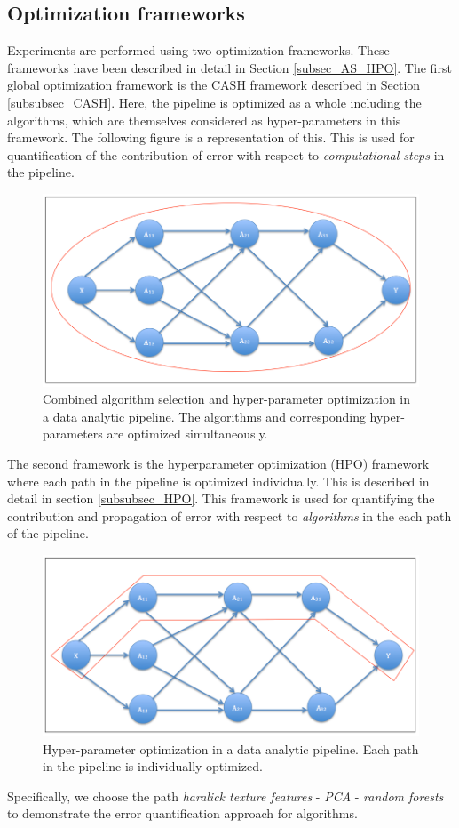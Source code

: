 \subsection{Optimization frameworks}
\label{frameworks}
Experiments are performed using two optimization frameworks. These frameworks have been described in detail in Section \ref{subsec_AS_HPO}. 
The first global optimization framework is the CASH framework described in Section \ref{subsubsec_CASH}. Here, the pipeline is optimized as a whole including the algorithms, which are themselves considered as hyper-parameters in this framework. The following figure is a representation of this. This is used for quantification of the contribution of error with respect to \textit{computational steps} in the pipeline.
\begin{figure}[H]
    \centering
    \includegraphics[scale=0.4]{img/EP/CASH}
    \caption{Combined algorithm selection and hyper-parameter optimization in a data analytic pipeline. The algorithms and corresponding hyper-parameters are optimized simultaneously.}
    \label{fig:CASH}
\end{figure}
The second framework is the hyperparameter optimization (HPO) framework where each path in the pipeline is optimized individually. This is described in detail in section \ref{subsubsec_HPO}. This framework is used for quantifying the contribution and propagation of error with respect to \textit{algorithms} in the each path of the pipeline.
\begin{figure}[H]
    \centering
    \includegraphics[scale=0.4]{img/EP/HPO}
    \caption{Hyper-parameter optimization in a data analytic pipeline. Each path in the pipeline is individually optimized.}
    \label{fig:HPO}
\end{figure}
Specifically, we choose the path \textit{haralick texture features} - \textit{PCA} - \textit{random forests} to demonstrate the error quantification approach for algorithms.

